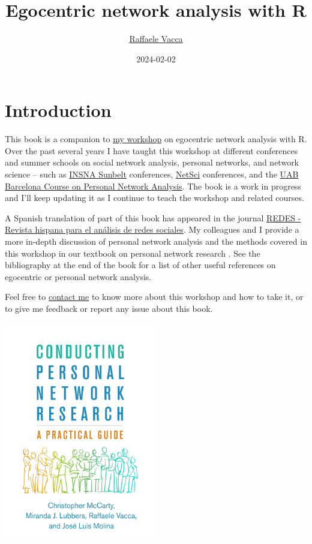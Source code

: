 \documentclass[
]{book}
\title{Egocentric network analysis with R}
\author{\href{http://www.raffaelevacca.com/}{Raffaele Vacca}}
\date{2024-02-02}
\begin{document}
\maketitle

{
\setcounter{tocdepth}{1}
\tableofcontents
}
\hypertarget{introduction}{%
\chapter{Introduction}\label{introduction}}

This book is a companion to \href{http://www.raffaelevacca.com/teaching/egocentric-r/}{my workshop} on egocentric network analysis with R. Over the past several years I have taught this workshop at different conferences and summer schools on social network analysis, personal networks, and network science -- such as \href{https://www.insna.org/}{INSNA Sunbelt} conferences, \href{https://netscisociety.net/home}{NetSci} conferences, and the \href{https://sway.office.com/1TpXMhGqKa7fTsAC}{UAB Barcelona Course on Personal Network Analysis}. The book is a work in progress and I'll keep updating it as I continue to teach the workshop and related courses.

A Spanish translation of part of this book has appeared in the journal \href{https://revistes.uab.cat/redes/article/view/v31-n2-vacca}{REDES - Revista hispana para el análisis de redes sociales}. My colleagues and I provide a more in-depth discussion of personal network analysis and the methods covered in this workshop in our textbook on personal network research \citep{mccarty_conducting_2019}. See the bibliography at the end of the book for a list of other useful references on egocentric or personal network analysis.

Feel free to \href{http://www.raffaelevacca.com/}{contact me} to know more about this workshop and how to take it, or to give me feedback or report any issue about this book.

\href{https://www.guilford.com/books/Conducting-Personal-Network-Research/McCarty-Lubbers-Vacca-Molina/9781462538386/authors}{\includegraphics[width=0.5\textwidth,height=\textheight]{./Figures/McCarty_et_al_2019_cover.jpg}}
\end{document}
